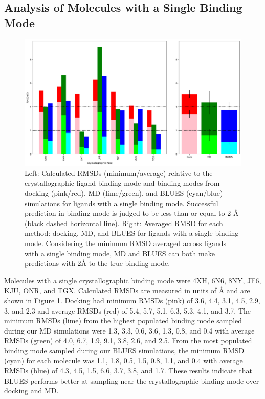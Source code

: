 \subsection{Analysis of Molecules with a Single Binding Mode}

\begin{figure}
    \centering
    \includegraphics{chapter6/Figures/singlebm.png}
    \caption[Single Binding Mode RMSD]{Left: Calculated RMSDs (minimum/average) relative to the crystallographic ligand binding mode and binding modes from docking (pink/red), MD (lime/green), and BLUES (cyan/blue) simulations for ligands with a single binding mode. Successful prediction in binding mode is judged to be less than or equal to 2 {\AA} (black dashed horizontal line). Right: Averaged RMSD for each method: docking, MD, and BLUES for ligands with a single binding mode. Considering the minimum RMSD averaged across ligands with a single binding mode, MD and BLUES can both make predictions with 2{\AA} to the true binding mode.}
    \label{fig:singlebm}
\end{figure}

Molecules with a single crystallographic binding mode were 4XH, 6N6, 8NY, JF6, KJU, ONR, and TGX.
Calculated RMSDs are measured in units of  {\AA} and are shown in Figure \ref{fig:singlebm}.
Docking had minimum RMSDs (pink) of 3.6, 4.4, 3.1, 4.5, 2.9, 3, and 2.3 and average RMSDs (red) of 5.4, 5.7, 5.1, 6.3, 5.3, 4.1, and 3.7.
The minimum RMSDs (lime) from the highest populated binding mode sampled during our MD simulations were 1.3, 3.3, 0.6, 3.6, 1.3, 0.8, and 0.4 with average RMSDs (green) of 4.0, 6.7, 1.9, 9.1, 3.8, 2.6, and 2.5.
From the most populated binding mode sampled during our BLUES simulations, the minimum RMSD (cyan) for each molecule was 1.1, 1.8, 0.5, 1.5, 0.8, 1.1, and 0.4 with average RMSDs (blue) of 4.3, 4.5, 1.5, 6.6, 3.7, 3.8, and 1.7.
These results indicate that BLUES performs better at sampling near the crystallographic binding mode over docking and MD.

